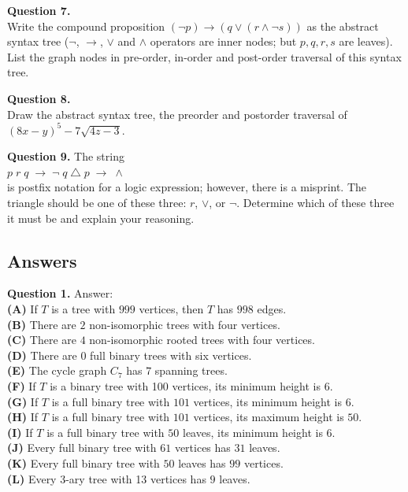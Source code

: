\documentclass[jou]{apa6}
\begin{document}
\vspace{10pt}
{\bf Question 7.}\\
Write the compound proposition $(\neg p) \rightarrow (q \vee (r \wedge \neg s))$ 
as the abstract syntax tree ($\neg$, $\rightarrow$, $\vee$ and $\wedge$ operators
are inner nodes; but $p,q,r,s$ are leaves).\\
List the graph nodes in pre-order, in-order and post-order traversal of this syntax tree.


\vspace{10pt}
{\bf Question 8.}\\
Draw the abstract syntax tree, the preorder and postorder traversal 
of $(8x - y)^5 - 7\sqrt{4z - 3}$.


\vspace{10pt}
{\bf Question 9.} 
The string\\
$p\;r\;q\;\rightarrow\;\neg\;q\;\triangle\;p\;\rightarrow\;\wedge$\\
is postfix notation for a logic expression; however, there is a misprint. The
triangle should be one of these three: $r$, $\vee$, or $\neg$. 
Determine which of these three it must be and explain your
reasoning.


\mbox{}
\newpage
\subsection{Answers}

\vspace{10pt}
{\bf Question 1.} Answer:\\
{\bf (A)} If $T$ is a tree with $999$ vertices, then $T$ has $998$ edges.\\
{\bf (B)} There are $2$ non-isomorphic trees with four vertices.\\
{\bf (C)} There are $4$ non-isomorphic rooted trees with four vertices.\\
{\bf (D)} There are $0$ full binary trees with six vertices.\\
{\bf (E)} The cycle graph $C_7$ has $7$ spanning trees.\\
{\bf (F)} If $T$ is a binary tree with 100 vertices, its minimum height is $6$.\\
{\bf (G)} If $T$ is a full binary tree with $101$ vertices, its minimum height is $6$.\\
{\bf (H)} If $T$ is a full binary tree with $101$ vertices, its maximum height is $50$.\\
{\bf (I)} If $T$ is a full binary tree with $50$ leaves, its minimum height is $6$.\\
{\bf (J)} Every full binary tree with $61$ vertices has $31$ leaves.\\
{\bf (K)} Every full binary tree with $50$ leaves has $99$ vertices.\\
{\bf (L)} Every 3-ary tree with 13 vertices has $9$ leaves.
\end{document}
